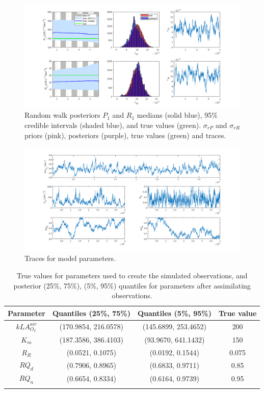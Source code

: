 \documentclass{ruthesis}
\begin{document}
\begin{figure}
	\centerline{\includegraphics[width=1.3\textwidth]{images_microalgae/posterior_plots_with_fake_data_other/P_and_R}}
	\caption[.]{Random walk posteriors $P_1$ and $R_1$ medians (solid blue), 95\% credible intervals (shaded blue), and true values (green). $\sigma_{rP}$ and $\sigma_{rR}$ priors (pink), posteriors (purple), true values (green) and traces.}
	\label{fig:pos_sim_P_and_R_other}
\end{figure}

\begin{figure}
	\centerline{\includegraphics[width=1.3\textwidth]{images_microalgae/posterior_plots_with_fake_data_other/model_parameters_traces}}
	\caption[.]{Traces for model parameters.}
	\label{fig:micro_sim_model_parameters_other_trace}
\end{figure}

\begin{longtable}{|c|c|c|c|} 
	\hline
	\bfseries{Parameter}  & \bfseries{Quantiles (25\%, 75\%)}  & \bfseries{Quantiles (5\%, 95\%)} &  \bfseries{True value} \\ \hline
	$kLA_{O_2}^{air}$ 	& (170.9854, 216.0578)  & (145.6899, 253.4652)  &  200 \\
	$K_m$ 				& (187.3586, 386.4103) 	& (93.9670, 641.1432) 	&  150 \\ 
	$R_R$ 				& (0.0521, 0.1075) 		& (0.0192, 0.1544) 		& 0.075 \\
	$RQ_d$ 				& (0.7906, 0.8965) 		& (0.6833, 0.9711) 		& 0.85 \\	
	$RQ_n$ 				& (0.6654, 0.8334) 		& (0.6164, 0.9739) 		& 0.95 \\	
	\hline
	\caption[.]{True values for parameters used to create the simulated observations, and posterior (25\%, 75\%), (5\%, 95\%) quantiles for parameters after assimilating observations.}	
	\label{table:micro_parameters_sim_other}
\end{longtable}
\end{document}
